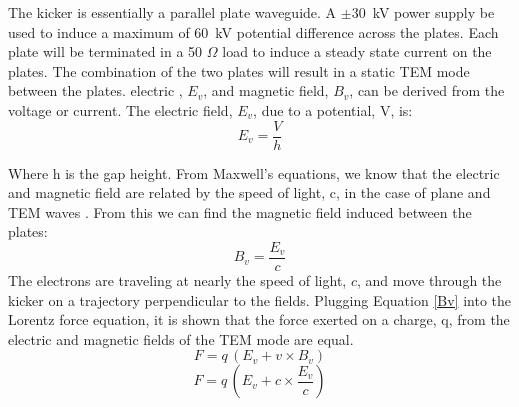 The kicker is essentially a parallel plate waveguide. 
A $\pm$\SI{30}{kV} power supply  be used to induce a maximum of \SI{60}{kV} potential difference 
across the plates. Each plate will be terminated in a 50 $\Omega$ load to induce a steady 
state current on the plates.  The combination of the two plates will result in a static TEM mode 
between the plates.  electric , $E_v$, and magnetic field, $B_v$,
can be derived from the voltage or current. The electric field, $E_v$, due to a potential, V, is: 
\begin{equation}
E_v=\frac{V}{h}
\end{equation}

Where h is the gap height. From Maxwell's equations, we know that the electric and magnetic 
field are related by the speed of light, c, in the case of plane and TEM waves \cite{pozar}. 
From this we can find the magnetic field induced between the plates: 
\begin{equation}
B_v=\frac{E_v}{c}
\end{equation}\label{Bv}
The electrons are traveling at nearly the speed of light, $c$, and move through the kicker on a 
trajectory perpendicular to the fields.  Plugging Equation \ref{Bv} into the Lorentz force equation, 
it is shown that the force exerted on a charge, q, 
from the electric and magnetic fields of the TEM mode are equal. 
\begin{equation}
F=q\,(E_v+v\times B_v)
\end{equation}
\begin{equation}
	F = q \,\left(E_v+c\times \frac{E_v}{c}\right)
\end{equation}

